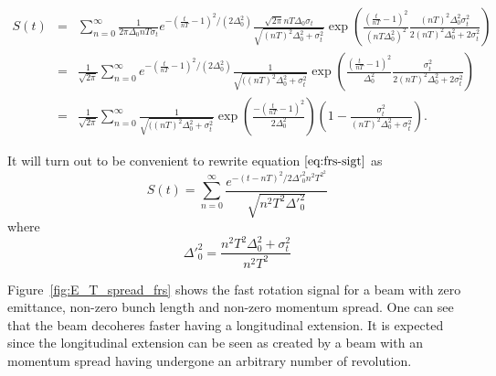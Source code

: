 {\small
\begin{eqnarray}
S(t)&=&\sum_{n=0}^\infty\frac{1}{2\pi\Delta_0nT\sigma_t}e^{-(\frac{t}{nT}-1)^2/(2\Delta_0^2)}
\frac{\sqrt{2\pi}nT\Delta_0\sigma_t}{\sqrt{(nT)^2\Delta_0^2+\sigma_t^2}}
\exp(\frac{(\frac{t}{nT}-1)^2}{(nT\Delta_0^2)^2}\frac{(nT)^2\Delta_0^2\sigma_t^2}{2(nT)^2\Delta_0^2+2\sigma_t^2})\nonumber\\
&=& \frac{1}{\sqrt{2\pi}}\sum_{n=0}^\infty e^{-(\frac{t}{nT}-1)^2/(2\Delta_0^2)}
\frac{1}{\sqrt{((nT)^2\Delta_0^2+\sigma_t^2}}
\exp(\frac{(\frac{t}{nT}-1)^2}{\Delta_0^2}\frac{\sigma_t^2}{2(nT)^2\Delta_0^2+2\sigma_t^2})\nonumber\\
&=& \frac{1}{\sqrt{2\pi}}\sum_{n=0}^\infty
\frac{1}{\sqrt{((nT)^2\Delta_0^2+\sigma_t^2}}
\exp\left(\frac{-(\frac{t}{nT}-1)^2}{2\Delta_0^2}\right)\left(1-\frac{\sigma_t^2}{(nT)^2\Delta_0^2+\sigma_t^2}\right).\label{eq:frs-sigt}
\end{eqnarray}
}

It will turn out to be convenient to rewrite equation$~\eqref{eq:frs-sigt}$ as 
\begin{equation}
S(t)=\sum^{\infty}_{n=0}\frac{e^{-(t-nT)^2/2\Delta'^2_0n^2T^2^2}}{\sqrt{n^2T^2\Delta'^2_0}}
\label{eq:frs-sigtsimp}
\end{equation}
where \[\Delta'^2_0=\frac{n^2T^2\Delta^2_0+\sigma^2_t}{n^2T^2}\]

Figure~\ref{fig:E_T_spread_frs} shows the fast rotation signal for a beam with zero emittance, non-zero bunch length and non-zero momentum spread.
One can see that the beam decoheres faster having a longitudinal extension. It is expected since the longitudinal extension can be seen as 
created by a beam with an momentum spread having undergone an arbitrary number of revolution.

